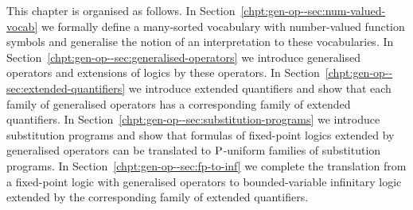 \documentclass[../main/thesis.tex]{subfiles}
\begin{document}
This chapter is organised as follows. In
Section~\ref{chpt:gen-op--sec:num-valued-vocab} we formally define a many-sorted
vocabulary with number-valued function symbols and generalise the notion of an
interpretation to these vocabularies. In
Section~\ref{chpt:gen-op--sec:generalised-operators} we introduce generalised
operators and extensions of logics by these operators. In
Section~\ref{chpt:gen-op--sec:extended-quantifiers} we introduce extended
quantifiers and show that each family of generalised operators has a
corresponding family of extended quantifiers. In
Section~\ref{chpt:gen-op--sec:substitution-programs} we introduce substitution
programs and show that formulas of fixed-point logics extended by generalised
operators can be translated to $\mathrm{P}$-uniform families of substitution programs.
In Section~\ref{chpt:gen-op--sec:fp-to-inf} we complete the translation from a
fixed-point logic with generalised operators to bounded-variable infinitary
logic extended by the corresponding family of extended quantifiers.












\end{document}
